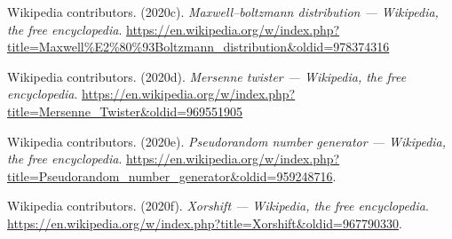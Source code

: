 \documentclass[
]{article}
\newlength{\cslhangindent}
\newenvironment{cslreferences}%
  {\setlength{\parindent}{0pt}%
  \everypar{\setlength{\hangindent}{\cslhangindent}}\ignorespaces}%
  {\par}
\begin{document}
\begin{cslreferences}
\leavevmode\hypertarget{ref-wiki:maxwell_boltzmann}{}%
Wikipedia contributors. (2020c). \emph{Maxwell--boltzmann distribution
--- Wikipedia, the free encyclopedia}.
\url{https://en.wikipedia.org/w/index.php?title=Maxwell\%E2\%80\%93Boltzmann_distribution\&oldid=978374316}

\leavevmode\hypertarget{ref-wiki:mersennetwister}{}%
Wikipedia contributors. (2020d). \emph{Mersenne twister --- Wikipedia,
the free encyclopedia}.
\url{https://en.wikipedia.org/w/index.php?title=Mersenne_Twister\&oldid=969551905}

\leavevmode\hypertarget{ref-wiki:prng}{}%
Wikipedia contributors. (2020e). \emph{Pseudorandom number generator ---
Wikipedia, the free encyclopedia}.
\url{https://en.wikipedia.org/w/index.php?title=Pseudorandom_number_generator\&oldid=959248716}.

\leavevmode\hypertarget{ref-wiki:xorshift}{}%
Wikipedia contributors. (2020f). \emph{Xorshift --- Wikipedia, the free
encyclopedia}.
\url{https://en.wikipedia.org/w/index.php?title=Xorshift\&oldid=967790330}.
\end{cslreferences}
\end{document}
